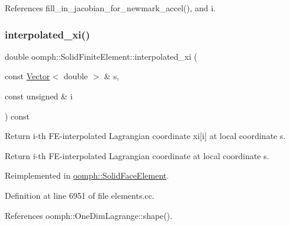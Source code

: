 References fill\+\_\+in\+\_\+jacobian\+\_\+for\+\_\+newmark\+\_\+accel(), and i.

\mbox{\label{classoomph_1_1SolidFiniteElement_a94ab4919b462d52cfdf6235bb9367d15}} 
\subsubsection{\texorpdfstring{interpolated\+\_\+xi()}{interpolated\_xi()}\hspace{0.1cm}{\footnotesize\ttfamily [1/2]}}
{\footnotesize\ttfamily double oomph\+::\+Solid\+Finite\+Element\+::interpolated\+\_\+xi (\begin{DoxyParamCaption}\item[{const \hyperlink{classoomph_1_1Vector}{Vector}$<$ double $>$ \&}]{s,  }\item[{const unsigned \&}]{i }\end{DoxyParamCaption}) const\hspace{0.3cm}{\ttfamily [virtual]}}



Return i-\/th F\+E-\/interpolated Lagrangian coordinate xi\mbox{[}i\mbox{]} at local coordinate s. 

Return i-\/th F\+E-\/interpolated Lagrangian coordinate at local coordinate s. 

Reimplemented in \hyperlink{classoomph_1_1SolidFaceElement_ace3eb64ce511c869bd140922b6597667}{oomph\+::\+Solid\+Face\+Element}.



Definition at line 6951 of file elements.\+cc.



References oomph\+::\+One\+Dim\+Lagrange\+::shape().



